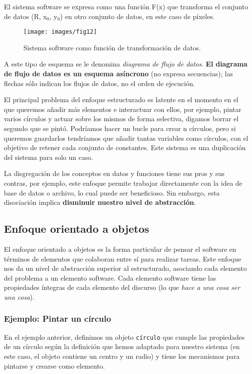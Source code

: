 El sistema software se expresa como una función F(x) que transforma el
conjunto de datos (R, x\(_{\text{0}}\), y\(_{\text{0}}\)) en otro
conjunto de datos, en este caso de píxeles.

\begin{figure}[ht!]  \centering
  \texttt{[image: images/fig12]}
  \caption{Sistema software como función de transformación de datos.}
  \label{fig:12}
\end{figure}

A este tipo de esquema se le denomina \emph{diagrama de flujo de
  datos}. \textbf{El diagrama de flujo de datos es un esquema asíncrono}
(no expresa secuencias); las flechas sólo indican los flujos de datos,
no el orden de ejecución.

\vspace{5mm}

El principal problema del enfoque estructurado es latente en el
momento en el que queremos añadir más elementos e interactuar con
ellos, por ejemplo, pintar varios círculos y actuar sobre los mismos
de forma selectiva, digamos borrar el segundo que se pintó.  Podríamos
hacer un bucle para crear n círculos, pero si queremos guardarlos
tendríamos que añadir tantas variables como círculos, con el objetivo
de retener cada conjunto de constantes. Este sistema es una
duplicación del sistema para solo un caso.

\vspace{5mm}

La disgregación de los conceptos en datos y funciones tiene sus pros y
sus contras, por ejemplo, este enfoque permite trabajar directamente
con la idea de base de datos o archivo, lo cual puede ser
beneficioso. Sin embargo, esta disociación implica \textbf{disminuir
  nuestro nivel de abstracción}.
\subsection{Enfoque orientado a objetos}
\label{sec:orgab1dc13} El enfoque orientado a objetos es la forma
particular de pensar el software en términos de elementos que
colaboran entre sí para realizar tareas.  Este enfoque nos da un nivel
de abstracción superior al estructurado, asociando cada elemento del
problema a un elemento software.  Cada elemento software tiene las
propiedades íntegras de cada elemento del discurso (lo que \emph{hace
  a una cosa ser una cosa}).
\subsubsection{Ejemplo: Pintar un círculo}
\label{sec:orge1a8962} En el ejemplo anterior, definimos un objeto
\texttt{círculo} que cumple las propiedades de un círculo según la
definición que hemos adaptado para nuestro sistema (en este caso, el
objeto contiene un centro y un radio) y tiene los mecanismos para
pintarse y crearse como elemento.

